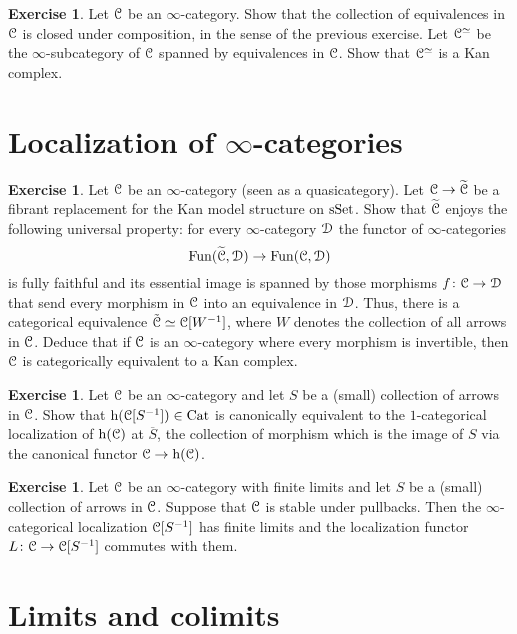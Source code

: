 \documentclass[10pt,a4paper,reqno,oneside]{book} %
\theoremstyle{plain}
\theoremstyle{definition}
\newtheorem{exercise}[thm]{Exercise}
\theoremstyle{remark}
\numberwithin{equation}{section}
\begin{document}
\begin{exercise}
	Let $\mathcal C$ be an $\infty$-category. Show that the collection of equivalences in $\mathcal C$ is closed under composition, in the sense of the previous exercise.
	Let $\mathcal C^{\simeq}$ be the $\infty$-subcategory of $\mathcal C$ spanned by equivalences in $\mathcal C$.
	Show that $\mathcal C^{\simeq}$ is a Kan complex.
\end{exercise}

\section{Localization of $\infty$-categories}

\begin{exercise} \label{ex:eveloping_groupoid}
	Let $\mathcal C$ be an $\infty$-category (seen as a quasicategory).
	Let $\mathcal C \to \widetilde{\mathcal C}$ be a fibrant replacement for the Kan model structure on $\mathrm{sSet}$.
	Show that $\widetilde{\mathcal C}$ enjoys the following universal property: for every $\infty$-category $\mathcal D$ the functor of $\infty$-categories
	\[ \operatorname{Fun}(\widetilde{\mathcal C}, \mathcal D) \to \operatorname{Fun}(\mathcal C, \mathcal D) \]
	is fully faithful and its essential image is spanned by those morphisms $f \colon \mathcal C \to \mathcal D$ that send every morphism in $\mathcal C$ into an equivalence in $\mathcal D$.
	Thus, there is a categorical equivalence $\tilde{\mathcal C} \simeq \mathcal C[W^{-1}]$, where $W$ denotes the collection of all arrows in $\mathcal C$.
	Deduce that if $\mathcal C$ is an $\infty$-category where every morphism is invertible, then $\mathcal C$ is categorically equivalent to a Kan complex.
\end{exercise}

\begin{exercise}
	Let $\mathcal C$ be an $\infty$-category and let $S$ be a (small) collection of arrows in $\mathcal C$.
	Show that $\mathrm h(\mathcal C[S^{-1}]) \in \mathrm{Cat}$ is canonically equivalent to the $1$-categorical localization of $\mathrm h(\mathcal C)$ at $\overline{S}$, the collection of morphism which is the image of $S$ via the canonical functor $\mathcal C \to \mathrm h(\mathcal C)$.
\end{exercise}

\begin{exercise}
	Let $\mathcal C$ be an $\infty$-category with finite limits and let $S$ be a (small) collection of arrows in $\mathcal C$.
	Suppose that $\mathcal C$ is stable under pullbacks.
	Then the $\infty$-categorical localization $\mathcal C[S^{-1}]$ has finite limits and the localization functor $L \colon \mathcal C \to \mathcal C[S^{-1}]$ commutes with them.
\end{exercise}

\section{Limits and colimits}
\end{document}
